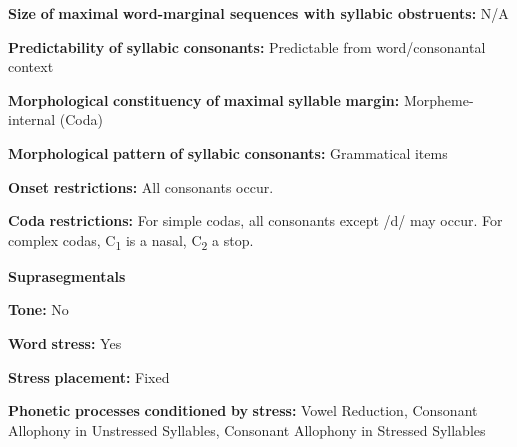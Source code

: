 \documentclass[output=paper]{langsci/langscibook}
\begin{document}
\begin{styleBody}
\textbf{Size} \textbf{of} \textbf{maximal} \textbf{word{}-marginal sequences with syllabic obstruents:} N/A
\end{styleBody}

\begin{styleBody}
\textbf{Predictability} \textbf{of} \textbf{syllabic} \textbf{consonants:} Predictable from word/consonantal context
\end{styleBody}

\begin{styleBody}
\textbf{Morphological} \textbf{constituency} \textbf{of} \textbf{maximal} \textbf{syllable} \textbf{margin:} Morpheme-internal (Coda)
\end{styleBody}

\begin{styleBody}
\textbf{Morphological} \textbf{pattern} \textbf{of} \textbf{syllabic} \textbf{consonants:} Grammatical items
\end{styleBody}

\begin{styleBody}
\textbf{Onset} \textbf{restrictions:} All consonants occur.
\end{styleBody}

\begin{styleBody}
\textbf{Coda} \textbf{restrictions:} For simple codas, all consonants except /d/ may occur. For complex codas, C\textsubscript{1} is a nasal, C\textsubscript{2} a stop.
\end{styleBody}

\begin{styleBody}
\textbf{Suprasegmentals}
\end{styleBody}

\begin{styleBody}
\textbf{Tone:} No
\end{styleBody}

\begin{styleBody}
\textbf{Word} \textbf{stress:} Yes
\end{styleBody}

\begin{styleBody}
\textbf{Stress} \textbf{placement:} Fixed
\end{styleBody}

\begin{styleBody}
\textbf{Phonetic} \textbf{processes} \textbf{conditioned} \textbf{by} \textbf{stress:} Vowel Reduction, Consonant Allophony in Unstressed Syllables, Consonant Allophony in Stressed Syllables
\end{styleBody}
\end{document}
